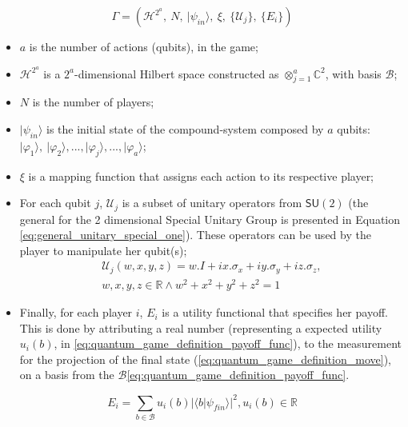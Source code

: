 \begin{equation}
\Gamma=(\mathcal{H}^{2^{a}},\: N,\:\vert\psi_{in}\rangle,\:\xi,\:\{\mathcal{U}_{j}\},\:\{E_{i}\})\label{eq:quantum_game_six_tuple}
\end{equation}

\begin{itemize}
\item $a$ is the number of actions (qubits), in the game; 
\item $\mathcal{H}^{2^{a}}$ is a $2^{a}$-dimensional Hilbert space constructed
as $\otimes_{j=1}^{a}\mathbb{C}^{2}$, with basis $\mathcal{B}$;
\item $N$ is the number of players;
\item $\vert\psi_{in}\rangle$ is the initial state of the compound-system
composed by $a$ qubits: $\vert\varphi_{1}\rangle,\:\vert\varphi_{2}\rangle, ..., \vert\varphi_{j}\rangle, ..., \vert\varphi_{a}\rangle$;
\item $\xi$ is a mapping function that assigns each action to its respective player;
\item For each qubit $j$, $\mathcal{U}_{j}$ is a subset of unitary operators from $\mathsf{SU}(2)$ (the general for the 2 dimensional Special Unitary Group is presented in Equation \eqref{eq:general_unitary_special_one}).
These operators can be used by the player to manipulate her qubit(s);
\begin{equation}
\begin{split}
\mathcal{U}_{j}(w,x,y,z)=w.I + ix.\sigma_{x} + iy.\sigma_{y} + iz.\sigma_{z}, \\  w,x,y,z \in \mathbb{R} \wedge  
w^2 + x^2 + y^2 + z^2 =1 
\end{split}
\label{eq:general_unitary_special_one}
\end{equation}
\item Finally, for each player $i$, $E_{i}$ is a utility functional that
specifies her payoff. This is done by attributing a real number (representing a expected utility $ u_{i}(b)$, in \eqref{eq:quantum_game_definition_payoff_func}), to the measurement for the projection of the final state (\eqref{eq:quantum_game_definition_move}), on a basis from the $\mathcal{B}$\eqref{eq:quantum_game_definition_payoff_func}.\end{itemize}



\begin{equation}
E_{i}=\sum_{b \in \mathcal{B}} u_{i}(b)\vert \langle b\vert \psi_{fin}\rangle\vert^{2}, u_{i}(b) \in \mathbb{R}
\label{eq:quantum_game_definition_payoff_func}
\end{equation}

